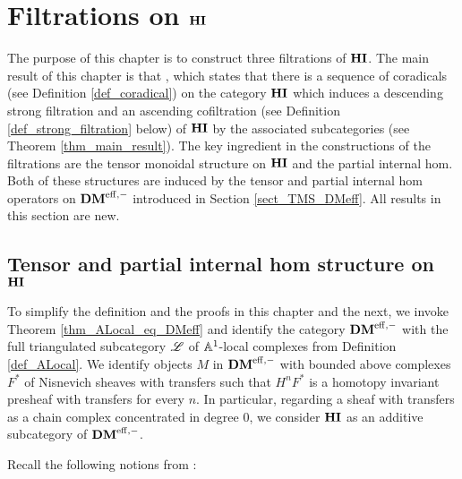 \newpage
\chapter{Filtrations on $\mathbf{HI}$}\label{sect_filtration_hi}

The purpose of this chapter is to construct three filtrations of 
$\mathbf{HI}$. The main result of this chapter is that , which states that 
there is a sequence of coradicals (see Definition 
\ref{def_coradical}) on the category $\mathbf{HI}$ which induces a 
descending strong filtration and an ascending cofiltration (see 
Definition \ref{def_strong_filtration} below) of $\mathbf{HI}$ by the 
associated subcategories (see Theorem \ref{thm_main_result}). The 
key ingredient in the constructions of the filtrations are the 
tensor monoidal structure on $\mathbf{HI}$ and the partial internal hom. 
Both of these structures are induced by the tensor and partial 
internal hom operators on $\mathbf{DM}^{\mathrm{eff},-}$ introduced in Section 
\ref{sect_TMS_DMeff}. All results in this section are new.

\section{Tensor and partial internal hom structure on $\mathbf{HI}$}

To simplify the definition and the proofs in this chapter and the
next, we invoke Theorem \ref{thm_ALocal_eq_DMeff} and identify the 
category $\mathbf{DM}^{\mathrm{eff},-}$ with the full triangulated subcategory $\mathscr{L}$ 
of $\mathbb{A}^1$-local complexes from Definition \ref{def_ALocal}. We identify 
objects $M$ in $\mathbf{DM}^{\mathrm{eff},-}$ with bounded above complexes $F^*$ of 
Nisnevich sheaves with transfers such that $H^nF^*$ is a homotopy 
invariant presheaf with transfers for every $n$. In particular, 
regarding a sheaf with transfers as a chain complex concentrated 
in degree 0, we consider $\mathbf{HI}$ as an additive subcategory of 
$\mathbf{DM}^{\mathrm{eff},-}$.

Recall the following notions from \cite[1.3]{BBD}:

